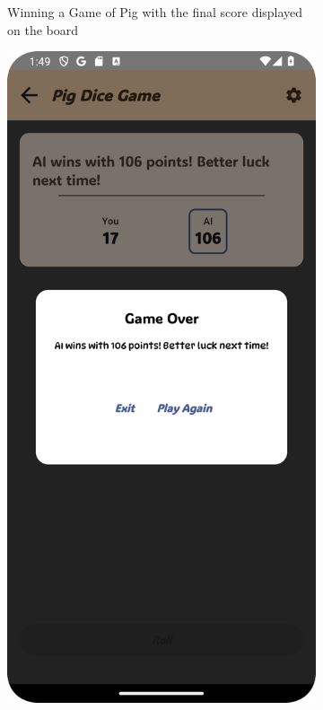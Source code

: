 \begin{figure}[ht!]
\begin{subfigure}[b]{0.27\textwidth}
        \caption{Winning a Game of Pig with the final score displayed on the board}
    \end{subfigure}
    \hfill
    \begin{subfigure}[b]{0.27\textwidth}
        \includegraphics[width=\textwidth]{img/pig board2.png}

\end{subfigure}
\end{figure}
